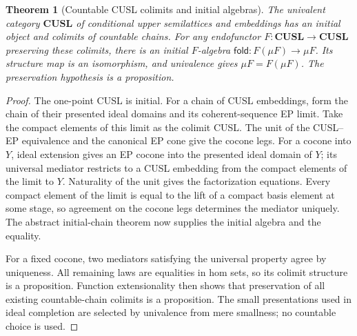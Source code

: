 \documentclass[11pt,a4paper]{article}
\newtheorem{theorem}{Theorem}[section]
\theoremstyle{definition}
\theoremstyle{remark}
\begin{document}
\begin{theorem}[Countable CUSL colimits and initial algebras]
\label{thm:cusl-initial}
The univalent category $\mathbf{CUSL}$ of conditional upper semilattices
and embeddings has an initial object and colimits of countable chains.
For any endofunctor $F:\mathbf{CUSL}\to\mathbf{CUSL}$ preserving these
colimits, there is an initial $F$-algebra
$\mathsf{fold}:F(\mu F)\to\mu F$. Its structure map is an isomorphism,
and univalence gives $\mu F=F(\mu F)$. The preservation hypothesis is a
proposition.
\end{theorem}
\begin{proof}
The one-point CUSL is initial. For a chain of CUSL embeddings, form the
chain of their presented ideal domains and its coherent-sequence EP limit.
Take the compact elements of this limit as the colimit CUSL. The unit of
the CUSL--EP equivalence and the canonical EP cone give the cocone legs.
For a cocone into $Y$, ideal extension gives an EP cocone into the presented
ideal domain of $Y$; its universal mediator restricts to a CUSL embedding
from the compact elements of the limit to $Y$. Naturality of the unit gives
the factorization equations. Every compact element of the limit is equal
to the lift of a compact basis element at some stage, so agreement on the
cocone legs determines the mediator uniquely. The abstract initial-chain
theorem now supplies the initial algebra and the equality.

For a fixed cocone, two mediators satisfying the universal property agree
by uniqueness. All remaining laws are equalities in hom sets, so its
colimit structure is a proposition. Function extensionality then shows
that preservation of all existing countable-chain colimits is a
proposition. The small presentations used in ideal completion are
selected by univalence from mere smallness; no countable choice is used.
\end{proof}
\end{document}
